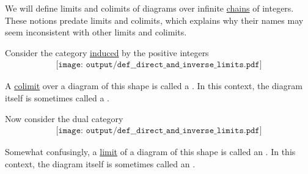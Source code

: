 \begin{definition}\label{def:direct_and_inverse_limits}
  We will define limits and colimits of diagrams over infinite \hyperref[def:partially_ordered_set_chain_and_antichain]{chains} of integers. These notions predate limits and colimits, which explains why their names may seem inconsistent with other limits and colimits.

  \begin{thmenum}
     Consider the category \hyperref[thm:order_category_isomorphism]{induced} by the positive integers
    \begin{equation}\label{eq:def:direct_and_inverse_limits/direct}
      \begin{aligned}
        \texttt{[image: output/def\_\_direct\_and\_inverse\_limits.pdf]}
      \end{aligned}
    \end{equation}

    A \hyperref[def:category_of_cones/colimit]{colimit} over a diagram of this shape is called a . In this context, the diagram itself is sometimes called a .

     Now consider the dual category
    \begin{equation}\label{eq:def:direct_and_inverse_limits/inverse}
      \begin{aligned}
        \texttt{[image: output/def\_\_direct\_and\_inverse\_limits.pdf]}
      \end{aligned}
    \end{equation}

    Somewhat confusingly, a \hyperref[def:category_of_cones/limit]{limit} of a diagram of this shape is called an . In this context, the diagram itself is sometimes called an .
  \end{thmenum}
\end{definition}

